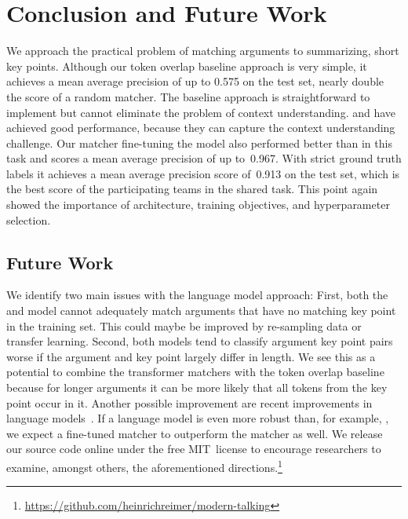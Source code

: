 \section{Conclusion and Future Work}\label{conclusion}

We approach the practical problem of matching arguments to summarizing, short key points.
Although our token overlap baseline approach is very simple, it achieves a mean average precision of up to 0.575 on the test set, nearly double the score of a random matcher. 
The baseline approach is straightforward to implement but cannot eliminate the problem of context understanding. 
\Roberta and \Bert have achieved good performance, because they can capture the context understanding challenge. 
Our matcher fine-tuning the \RobertaBase model also performed better than \Bert in this task and scores a mean average precision of up to~0.967. %
With strict ground truth labels it achieves a mean average precision score of~0.913 on the test set, which is the best score of the participating teams in the shared task.
This point again showed the importance of architecture, training objectives, and hyperparameter selection.

\subsection{Future Work}

We identify two main issues with the language model approach:
First, both the \BertBase and \RobertaBase model cannot adequately match arguments that have no matching key point in the training set.
This could maybe be improved by re-sampling data or transfer learning.
Second, both models tend to classify argument key point pairs worse if the argument and key point largely differ in length.
We see this as a potential to combine the transformer matchers with the token overlap baseline because for longer arguments it can be more likely that all tokens from the key point occur in it.
Another possible improvement are recent improvements in language models~\cite{Sun2021WFDPSLCZLLWGLSSLOYTWW}.
If a language model is even more robust than, for example, \Roberta, we expect a fine-tuned matcher to outperform the \RobertaBase matcher as well.
We release our source code online under the free MIT~license to encourage researchers to examine, amongst others, the aforementioned directions.\footnote{\url{https://github.com/heinrichreimer/modern-talking}}
